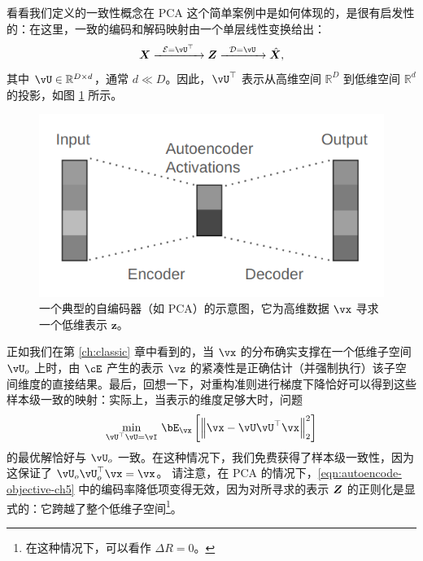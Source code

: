 \documentclass[../../book-main.tex]{subfiles}
\begin{document}
看看我们定义的一致性概念在 PCA 这个简单案例中是如何体现的，是很有启发性的：在这里，一致的编码和解码映射由一个单层线性变换给出：
\begin{equation}
  \X \xrightarrow{\hspace{2mm} \mathcal{E} = \vU^\top \hspace{2mm}}
  \Z \xrightarrow{\hspace{2mm} \mathcal{D} = \vU \hspace{2mm}}   \hat{\X},
  \label{eqn:autoencoding-PCA-2}
\end{equation}
其中 $\vU \in \mathbb{R}^{D\times d}$，通常 $d\ll D$。因此，$\vU^\top$ 表示从高维空间 $\mathbb{R}^{D}$ 到低维空间 $\mathbb{R}^{d}$ 的投影，如图 \ref{fig:AE} 所示。
\begin{figure}
  \centering \includegraphics[width=0.5\linewidth]{figs_chap5/autoencoder.png}
  \caption{一个典型的自编码器（如 PCA）的示意图，它为高维数据 $\vx$ 寻求一个低维表示 $\bm{z}$。}
  \label{fig:AE}
\end{figure}

正如我们在第 \ref{ch:classic} 章中看到的，当 $\vx$ 的分布确实支撑在一个低维子空间 $\vU_o$ 上时，由 $\cE$ 产生的表示 $\vz$ 的紧凑性是正确估计（并强制执行）该子空间维度的直接结果。最后，回想一下，对重构准则进行梯度下降恰好可以得到这些样本级一致的映射：实际上，当表示的维度足够大时，问题
\begin{equation}\label{eq:pca-reconstruction-ch5}
  \min_{\vU^\top \vU = \vI}\, \bE_{\vx}\left[\norm*{\vx
  - \vU\vU^\top \vx}_2^2\right]
\end{equation}
的最优解恰好与 $\vU_o$ 一致。在这种情况下，我们免费获得了样本级一致性，因为这保证了 $\vU_o\vU_o^\top \vx = \vx$。
请注意，在 PCA 的情况下，\eqref{eqn:autoencode-objective-ch5} 中的编码率降低项变得无效，因为对所寻求的表示 $\bm{Z}$ 的正则化是显式的：它跨越了整个低维子空间\footnote{在这种情况下，可以看作 $\Delta R = 0$。}。
\end{document}
